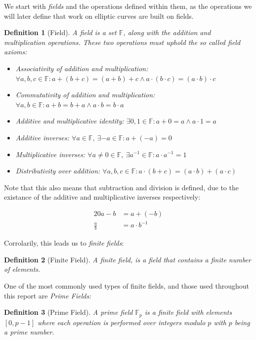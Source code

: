 \documentclass{article}
\newtheorem{definition}{Definition}[section]
\newcommand{\eq}[1]{\begin{alignat*}{20}#1\end{alignat*}}
\newcommand{\F}{\mathbb{F}}
\begin{document}
We start with \textit{fields} and the operations defined within
them, as the operations we will later define that work on elliptic
curves are built on fields.

\begin{definition}[Field]
	A field is a set $\F$, along with the \textit{addition} and
	\textit{multiplication} operations. These two operations must
	uphold the so called \textit{field axioms}:

	\begin{itemize}
		\item Associativity of addition and multiplication:
		$\forall a,b,c \in \F : a + (b + c) = (a + b) + c \land a \cdot (b \cdot c) = (a \cdot b) \cdot c$
		\item Commutativity of addition and multiplication:
		$\forall a,b \in \F : a+b=b+a \land a \cdot b = b \cdot a$
		\item Additive and multiplicative identity:
		$\exists 0,1 \in \F : a + 0 = a \land a \cdot 1 = a$
		\item Additive inverses:
		$\forall a \in \F,\ \exists {-a} \in \F : a + ({-a}) = 0$
		\item Multiplicative inverses:
		$\forall a \neq 0 \in \F,\  \exists a^{-1} \in \F : a \cdot a^{-1} = 1$
		\item Distributivity over addition:
		$\forall a,b,c \in \F : a \cdot (b + c) = (a \cdot b) + (a \cdot c)$
	\end{itemize}
\end{definition}

Note that this also means that subtraction and division is defined,
due to the existance of the additive and multiplicative inverses
respectively:

\eq{
	a-b         &= a + (-b) \\
	\frac{a}{b} &= a \cdot b^{-1}
}

Corrolarily, this leads us to \textit{finite fields}:

\begin{definition}[Finite Field]
	A finite field, is a field that contains a finite number of elements.
\end{definition}

One of the most commonly used types of finite fields, and those used
throughout this report are \textit{Prime Fields:} 

\begin{definition}[Prime Field]
	A prime field $\F_p$ is a finite field with elements $[0,p-1]$
	where each operation is performed over integers modulo $p$ with $p$ being a prime number.
\end{definition}
\end{document}
